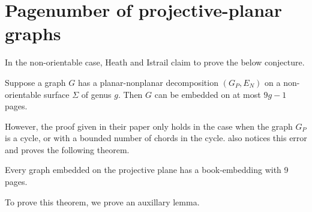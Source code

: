 
\section{Pagenumber of projective-planar graphs}
In the non-orientable case, Heath and Istrail claim to prove the below conjecture.
\begin{conjecture}\label{lem:planar_nonplanar_nonorientable}
	Suppose a graph \(G\) has a planar-nonplanar decomposition \((G_P, E_N)\) on a non-orientable surface \(\Sigma\) of genus $g$. Then \(G\) can be embedded on at most \(9g - 1\) pages.
\end{conjecture}
However, the proof given in their paper only holds in the case when the graph $G_P$ is a cycle, or with a bounded number of chords in the cycle. \textcite{nakamotoBookEmbeddingProjectiveplanar2015} also notices this error and proves the following theorem.

\begin{theorem}\label{thm:proj_planar_graphs_9pages}
	Every graph embedded on the projective plane has a book-embedding with 9 pages.
\end{theorem}

To prove this theorem, we prove an auxillary lemma. 

